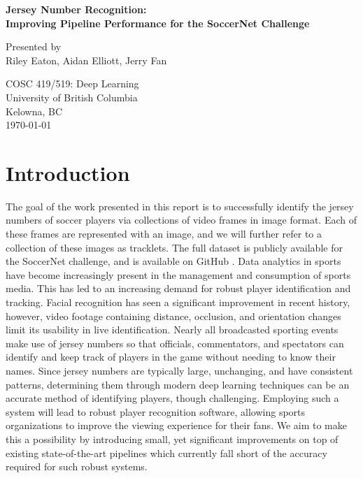 \documentclass[11pt, letterpaper]{article}
\begin{document}
\begin{titlepage}
  \begin{center}
      \vspace*{1cm}
      
      \fontsize{14}{14}\textbf{Jersey Number Recognition:} \\
      \vspace{0.1cm}
      \fontsize{14}{14}\textbf{Improving Pipeline Performance for the SoccerNet Challenge}
      
      \vspace{0.5cm}
      Presented by \\
      Riley Eaton, Aidan Elliott, Jerry Fan
      
      \vfill
      
      COSC 419/519: Deep Learning \\
      University of British Columbia \\
      Kelowna, BC \\
      \today

  \end{center}
\end{titlepage}

\clearpage
\section{Introduction}
The goal of the work presented in this report is to successfully identify the jersey numbers of soccer players via collections of video frames in image format. Each of these frames are represented with an image, and we will further refer to a collection of these images as tracklets. The full dataset is publicly available for the SoccerNet challenge, and is available on GitHub \cite{soccernet_repo}. Data analytics in sports have become increasingly present in the management and consumption of sports media. This has led to an increasing demand for robust player identification and tracking. Facial recognition has seen a significant improvement in recent history, however, video footage containing distance, occlusion, and orientation changes limit its usability in live identification. Nearly all broadcasted sporting events make use of jersey numbers so that officials, commentators, and spectators can identify and keep track of players in the game without needing to know their names. Since jersey numbers are typically large, unchanging, and have consistent patterns, determining them through modern deep learning techniques can be an accurate method of identifying players, though challenging. Employing such a system will lead to robust player recognition software, allowing sports organizations to improve the viewing experience for their fans. We aim to make this a possibility by introducing small, yet significant improvements on top of existing state-of-the-art pipelines which currently fall short of the accuracy required for such robust systems.
\end{document}
